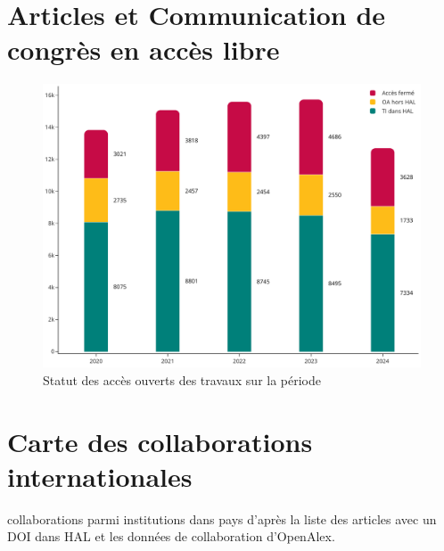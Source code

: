 \documentclass[french, 11pt]{../../dibiso/biso}
\begin{document}

\pagebreak

\section{Articles et Communication de congrès en accès libre} %

\begin{figure}[!h]
  \includegraphics[width=\textwidth]{figures/open_access_works.pdf}
  \caption{Statut des accès ouverts des travaux sur la période \oaworksperiod}
  \label{fig_open_access_works}
\end{figure}







\pagebreak

\section{Carte des collaborations internationales}

{\collaborationsnb} collaborations parmi {\institutionsnb} institutions dans {\countriesnb} pays d'après la liste des articles avec un DOI dans HAL et les données de collaboration d'OpenAlex.
\end{document}
